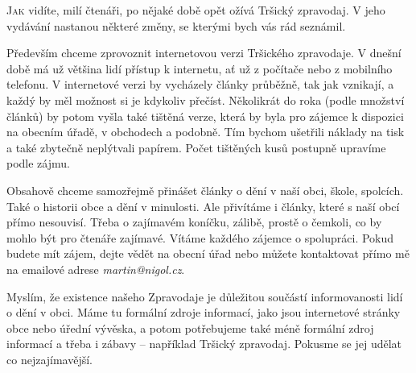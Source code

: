 \documentclass[10pt]{article}
\begin{document}
\begin{multicols}{3}{


\lettrine{J}{ak} vidíte, milí čtenáři, po nějaké době opět ožívá Tršický zpravodaj. V jeho vydávání nastanou některé změny, se kterými bych vás rád seznámil.

Především chceme zprovoznit internetovou verzi Tršického zpravodaje. V dnešní době má už většina lidí přístup k internetu, ať už z počítače nebo z mobilního telefonu. V internetové verzi by vycházely články průběžně, tak jak vznikají, a každý by měl možnost si je kdykoliv přečíst. Několikrát do roka (podle množství článků) by potom vyšla také tištěná verze, která by byla pro zájemce k dispozici na obecním úřadě, v obchodech a podobně. Tím bychom ušetřili náklady na tisk a také zbytečně neplýtvali papírem. Počet tištěných kusů postupně upravíme podle zájmu.

Obsahově chceme samozřejmě přinášet články o dění v naší obci, škole, spolcích. Také o historii obce a dění v minulosti. Ale přivítáme i články, které s naší obcí přímo nesouvisí. Třeba o zajímavém koníčku, zálibě, prostě o čemkoli, co by mohlo být pro čtenáře zajímavé. Vítáme každého zájemce o spolupráci. Pokud budete mít zájem, dejte vědět na obecní úřad nebo můžete kontaktovat přímo mě na emailové adrese \emph{martin@nigol.cz}.

Myslím, že existence našeho Zpravodaje je důležitou součástí informovanosti lidí o dění v obci. Máme tu formální zdroje informací, jako jsou internetové stránky obce nebo úřední vývěska, a potom potřebujeme také méně formální zdroj informací a třeba i zábavy – například Tršický zpravodaj. Pokusme se jej udělat co nejzajímavější.

}\end{multicols}

\closearticle
\end{document}

